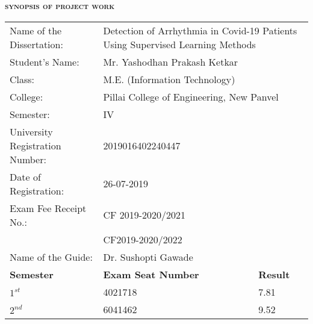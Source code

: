 \thispagestyle{empty}
{\centering\LARGE\bf
  {\scshape synopsis of project work}\\
}

\vspace{1cm}

{\centering
  \def\arraystretch{1.5}
  \begin{tabular}{p{13em}p{15em}p{6em}}
    Name of the Dissertation:       & \multicolumn{2}{p{22em}}{Detection of Arrhythmia in Covid-19 Patients Using Supervised Learning Methods}                   \\
    Student's Name:                 & Mr. Yashodhan Prakash Ketkar                                                                             &                 \\
    Class:                          & M.E. (Information Technology)                                                                            &                 \\
    College:                        & \multicolumn{2}{p{22em}}{Pillai College of Engineering, New Panvel}                                                        \\
    Semester:                       & IV                                                                                                       &                 \\
    University Registration Number: & 2019016402240447                                                                                                           \\
    Date of Registration:           & 26-07-2019                                                                                               &                 \\
    Exam Fee Receipt No.:           & CF 2019-2020/2021                                                                                        &                 \\
                                    & CF2019-2020/2022                                                                                         &                 \\
    Name of the Guide:              & Dr. Sushopti Gawade                                                                                      &                 \\
    \textbf{Semester}               & \textbf{Exam Seat Number}                                                                                & \textbf{Result} \\
    $1^{st}$                        & 4021718                                                                                                  & 7.81            \\
    $2^{nd}$                        & 6041462                                                                                                  & 9.52            \\
  \end{tabular}
}

